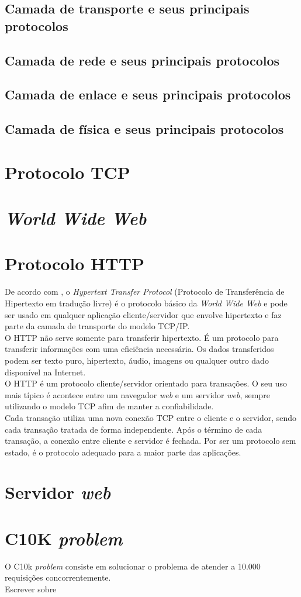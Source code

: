 \subsection{Camada de transporte e seus principais protocolos}
\subsection{Camada de rede e seus principais protocolos}
\subsection{Camada de enlace e seus principais protocolos}
\subsection{Camada de física e seus principais protocolos}

\section{Protocolo TCP}

\section{\textit{World Wide Web}}

\section{Protocolo HTTP}
De acordo com , o \textit{Hypertext Transfer Protocol} (Protocolo de Transferência de Hipertexto em tradução livre) é o protocolo básico da \textit{World Wide Web} e pode ser usado em qualquer aplicação cliente/servidor que envolve hipertexto e faz parte da camada de transporte do modelo TCP/IP.\\
O HTTP não serve somente para transferir hipertexto. É um protocolo para transferir informações com uma eficiência necessária. Os dados transferidos podem ser texto puro, hipertexto, áudio, imagens ou qualquer outro dado disponível na Internet.\\
O HTTP é um protocolo cliente/servidor orientado para transações. O seu uso mais típico é acontece entre um navegador \textit{web} e um servidor \textit{web}, sempre utilizando o modelo TCP afim de manter a confiabilidade.\\
Cada transação utiliza uma nova conexão TCP entre o cliente e o servidor, sendo cada transação tratada de forma independente. Após o término de cada transação, a conexão entre cliente e servidor é fechada. Por ser um protocolo sem estado, é o protocolo adequado para a maior parte das aplicações.

\section{Servidor \textit{web}}

\section{C10K \textit{problem}}
O C10k \textit{problem} consiste em solucionar o problema de atender a 10.000 requisições concorrentemente.\\
Escrever sobre